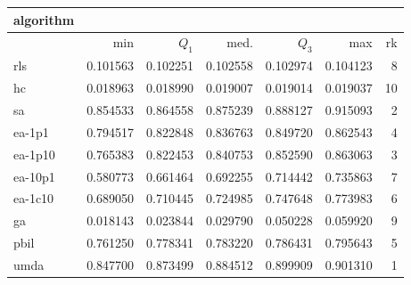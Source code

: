 \begin{tabular}{@{}l*{5}{>{{}}N{1}{3}}>{{}}N{2}{0}@{}}
\toprule
{algorithm} &  \\
\midrule
& {min} & {$Q_1$} & {med.} & {$Q_3$} & {max} & {rk}\\
\midrule
rls & 0.101563 & 0.102251 & 0.102558 & 0.102974 & 0.104123 & 8\\
hc & 0.018963 & 0.018990 & 0.019007 & 0.019014 & 0.019037 & 10\\
sa & {\color{blue}} 0.854533 & 0.864558 & 0.875239 & 0.888127 & {\color{blue}} 0.915093 & 2\\
ea-1p1 & 0.794517 & 0.822848 & 0.836763 & 0.849720 & 0.862543 & 4\\
ea-1p10 & 0.765383 & 0.822453 & 0.840753 & 0.852590 & 0.863063 & 3\\
ea-10p1 & 0.580773 & 0.661464 & 0.692255 & 0.714442 & 0.735863 & 7\\
ea-1c10 & 0.689050 & 0.710445 & 0.724985 & 0.747648 & 0.773983 & 6\\
ga & 0.018143 & 0.023844 & 0.029790 & 0.050228 & 0.059920 & 9\\
pbil & 0.761250 & 0.778341 & 0.783220 & 0.786431 & 0.795643 & 5\\
umda & 0.847700 & {\color{blue}} 0.873499 & {\color{blue}} 0.884512 & {\color{blue}} 0.899909 & 0.901310 & 1\\
\bottomrule
\end{tabular}
